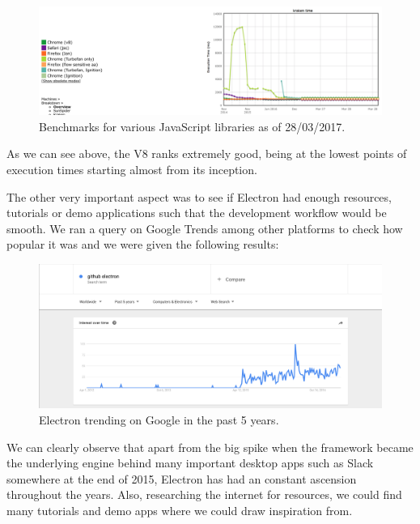 \documentclass{l4proj}
\begin{document}
\begin{figure}[!ht]
    \centering
    \includegraphics[scale=0.35]{v8-benchmark}
    \caption{Benchmarks for various JavaScript libraries as of 28/03/2017.}
    \label{fig:v8-benchmark}
\end{figure}

As we can see above, the V8 ranks extremely good, being at the lowest points of execution times starting almost from its inception.

The other very important aspect was to see if Electron had enough resources, tutorials or demo applications such that the development workflow would be smooth. We ran a query on Google Trends among other platforms to check how popular it was and we were given the following results:

\pagebreak

\begin{figure}[!ht]
    \centering
    \includegraphics[scale=0.35]{google-trends-electron}
    \caption{Electron trending on Google in the past 5 years.}
    \label{fig:google-trends-electron}
\end{figure}

We can clearly observe that apart from the big spike when the framework became the underlying engine behind many important desktop apps such as Slack somewhere at the end of 2015, Electron has had an constant ascension throughout the years. Also, researching the internet for resources, we could find many tutorials and demo apps where we could draw inspiration from.
\end{document}
